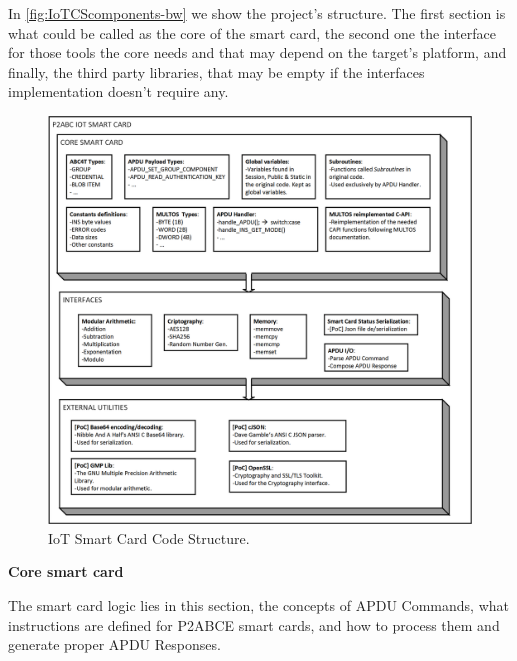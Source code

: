 \documentclass[journal]{IEEEtran}
\begin{document}
In \autoref{fig:IoTCScomponents-bw} we show the project's structure. The first section is what could be called as the core of the smart card, the second one the interface for those tools the core needs and that may depend on the target's platform, and finally, the third party libraries, that may be empty if the interfaces implementation doesn't require any.





\begin{figure}[bth]
	\begin{center}
		\includegraphics[width=\linewidth]{gfx/IoTCScomponents-bw}
	\end{center}
	\caption{IoT Smart Card Code Structure.}
	\label{fig:IoTCScomponents-bw}
\end{figure}


\hfil

\textbf{Core smart card}
\hfil

The smart card logic lies in this section, the concepts of APDU Commands, what instructions are defined for P2ABCE smart cards, and how to process them and generate proper APDU Responses.
\end{document}

